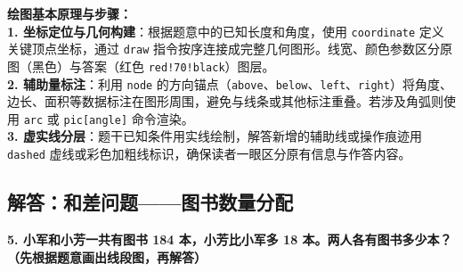{\small\color{blue!70!black}
\textbf{绘图基本原理与步骤：}\\
\textbf{1. 坐标定位与几何构建}：根据题意中的已知长度和角度，使用 \texttt{coordinate} 定义关键顶点坐标，通过 \texttt{draw} 指令按序连接成完整几何图形。线宽、颜色参数区分原图（黑色）与答案（红色 \texttt{red!70!black}）图层。\\
\textbf{2. 辅助量标注}：利用 \texttt{node} 的方向锚点（\texttt{above}、\texttt{below}、\texttt{left}、\texttt{right}）将角度、边长、面积等数据标注在图形周围，避免与线条或其他标注重叠。若涉及角弧则使用 \texttt{arc} 或 \texttt{pic[angle]} 命令渲染。\\
\textbf{3. 虚实线分层}：题干已知条件用实线绘制，解答新增的辅助线或操作痕迹用 \texttt{dashed} 虚线或彩色加粗线标识，确保读者一眼区分原有信息与作答内容。
}


\newpage

\newpage

\subsection{解答：和差问题——图书数量分配}

\vspace{0.4cm}

\noindent\textbf{5. 小军和小芳一共有图书 184 本，小芳比小军多 18 本。两人各有图书多少本？（先根据题意画出线段图，再解答）}

\vspace{0.8cm}

